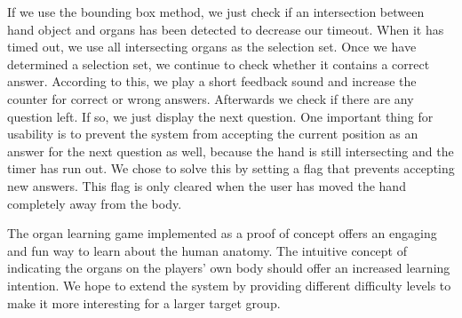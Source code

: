 If we use the bounding box method, we just check if an intersection between hand object and organs has been detected to decrease our timeout. When it has timed out, we use all intersecting organs as the selection set.
Once we have determined a selection set, we continue to check whether it contains a correct answer. According to this, we play a short feedback sound and increase the counter for correct or wrong answers. Afterwards we check if there are any question left. If so, we just display the next question. One important thing for usability is to prevent the system from accepting the current position as an answer for the next question as well, because the hand is still intersecting and the timer has run out. We chose to solve this by setting a flag that prevents accepting new answers. This flag is only cleared when the user has moved the hand completely away from the body.

The organ learning game implemented as a proof of concept offers an engaging and fun way to learn about the human anatomy. The intuitive concept of indicating the organs on the players' own body should offer an increased learning intention. 
We hope to extend the system by providing different difficulty levels to make it more interesting for a larger target group.

